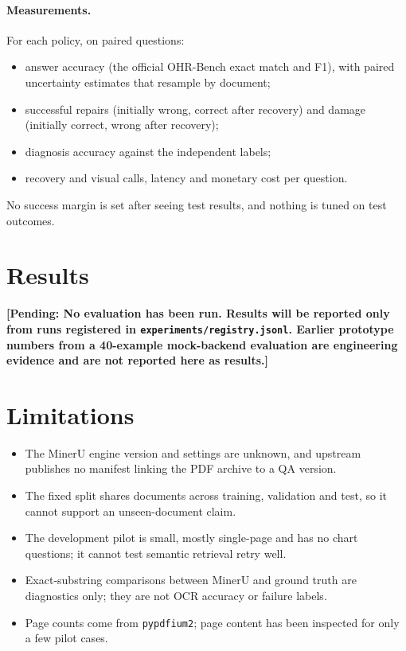 \documentclass[10pt]{article}
\newcommand{\pending}[1]{\textbf{[Pending: #1]}}
\begin{document}
\paragraph{Measurements.} For each policy, on paired questions:
\begin{itemize}
  \item answer accuracy (the official OHR-Bench exact match and F1), with paired uncertainty estimates that resample by document;
  \item successful repairs (initially wrong, correct after recovery) and damage (initially correct, wrong after recovery);
  \item diagnosis accuracy against the independent labels;
  \item recovery and visual calls, latency and monetary cost per question.
\end{itemize}
No success margin is set after seeing test results, and nothing is tuned on test outcomes.

\section{Results}

\pending{No evaluation has been run. Results will be reported only from runs registered in \texttt{experiments/registry.jsonl}. Earlier prototype numbers from a 40-example mock-backend evaluation are engineering evidence and are not reported here as results.}

\section{Limitations}

\begin{itemize}
  \item The MinerU engine version and settings are unknown, and upstream publishes no manifest linking the PDF archive to a QA version.
  \item The fixed split shares documents across training, validation and test, so it cannot support an unseen-document claim.
  \item The development pilot is small, mostly single-page and has no chart questions; it cannot test semantic retrieval retry well.
  \item Exact-substring comparisons between MinerU and ground truth are diagnostics only; they are not OCR accuracy or failure labels.
  \item Page counts come from \texttt{pypdfium2}; page content has been inspected for only a few pilot cases.
\end{itemize}
\end{document}
